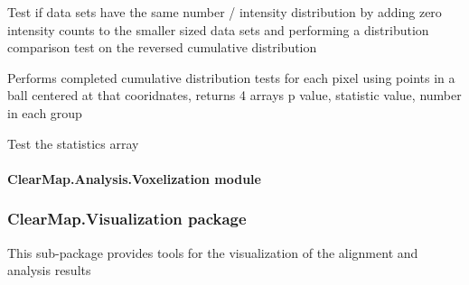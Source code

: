 \documentclass[letterpaper,10pt,english]{sphinxmanual}
\begin{document}

\begin{fulllineitems}
\label{api/ClearMap.Analysis:ClearMap.Analysis.Statistics.testCompletedInvertedCumulatives}
Test if data sets have the same number / intensity distribution by adding zero intensity counts to the smaller sized data sets and performing a distribution comparison test on the reversed cumulative distribution

\end{fulllineitems}


\begin{fulllineitems}
\label{api/ClearMap.Analysis:ClearMap.Analysis.Statistics.testCompletedCumulativesInSpheres}
Performs completed cumulative distribution tests for each pixel using points in a ball centered at that cooridnates, returns 4 arrays p value, statistic value, number in each group

\end{fulllineitems}


\begin{fulllineitems}
\label{api/ClearMap.Analysis:ClearMap.Analysis.Statistics.test}
Test the statistics array

\end{fulllineitems}



\paragraph{ClearMap.Analysis.Voxelization module}
\label{api/ClearMap.Analysis:clearmap-analysis-voxelization-module}

\subsubsection{ClearMap.Visualization package}
\label{api/ClearMap.Visualization:module-ClearMap.Visualization}\label{api/ClearMap.Visualization::doc}\label{api/ClearMap.Visualization:clearmap-visualization-package}
This sub-package provides tools for the visualization of the alignment and
analysis results
\end{document}
